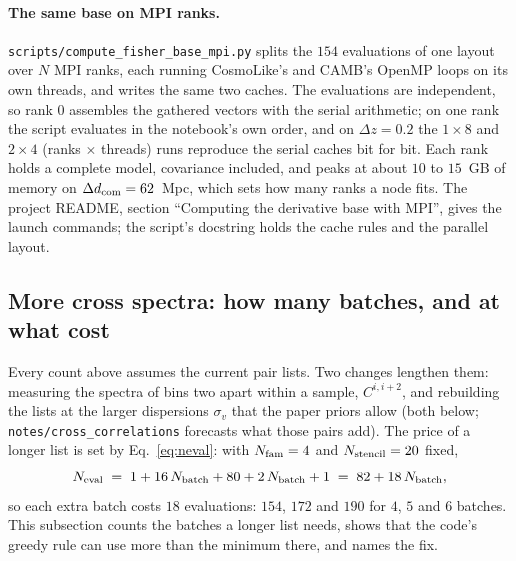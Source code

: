 \documentclass[11pt]{article}
\newcommand{\us}{\_\allowbreak}
\begin{document}
\paragraph{The same base on MPI ranks.}
\texttt{scripts/compute\us fisher\us base\us mpi.py} splits the $154$
evaluations of one layout over $N$ MPI ranks, each running CosmoLike's
and CAMB's OpenMP loops on its own threads, and writes the same two
caches.  The evaluations are independent, so rank $0$ assembles the
gathered vectors with the serial arithmetic; on one rank the script
evaluates in the notebook's own order, and on
$\Delta z = 0.2$ the $1 \times 8$ and $2 \times 4$ (ranks $\times$
threads) runs reproduce the serial caches bit for bit.  Each rank
holds a complete model, covariance included, and peaks at about $10$
to $15$~GB of memory on $\Delta d_{\rm com} = 62$~Mpc, which sets how
many ranks a node fits.  The project README, section ``Computing the
derivative base with MPI'', gives the launch commands; the script's
docstring holds the cache rules and the parallel layout.

\subsection{More cross spectra: how many batches, and at what cost}
\label{sec:morepairs}

Every count above assumes the current pair lists.  Two changes
lengthen them: measuring the spectra of bins two apart within a
sample, $C^{i,i+2}$, and rebuilding the lists at the larger dispersions
$\sigma_v$ that the paper priors allow (both below;
\texttt{notes/cross\us correlations} forecasts what those pairs
add).  The price of a
longer list is set by Eq.~\eqref{eq:neval}: with $N_{\rm fam} = 4$ and
$N_{\rm stencil} = 20$ fixed,
\begin{equation*}
  N_{\rm eval} \;=\; 1 + 16\,N_{\rm batch} + 80 + 2\,N_{\rm batch} + 1
  \;=\; 82 + 18\,N_{\rm batch} ,
\end{equation*}
so each extra batch costs $18$ evaluations: $154$, $172$ and $190$ for
$4$, $5$ and $6$ batches.  This subsection counts the batches a longer
list needs, shows that the code's greedy rule can use more than the
minimum there, and names the fix.
\end{document}
